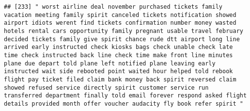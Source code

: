 \documentclass[
]{article}
\begin{document}
\begin{verbatim}
## [233] " worst airline deal november purchased tickets family vacation meeting family spirit canceled tickets notification showed airport idiots werent find tickets confirmation number money wasted hotels rental cars opportunity family pregnant usable travel february decided tickets family give spirit chance rude dtt airport long line arrived early instructed check kiosks bags check unable check late time check instructed back line check time make front line minutes plane due depart told plane left notified plane leaving early instructed wait side rebooted point waited hour helped told rebook flight pay ticket filed claim bank money back spirit reversed claim showed refused service directly spirit customer service run transferred department finally told email forever respond asked flight details provided month offer voucher audacity fly book refer spirit "                                                                                                                                                                                                                                                                                                                                                                                                                                                                                                                                                                                                                                                                                                                                                                                                                                                                                                   

\end{verbatim}
\end{document}
